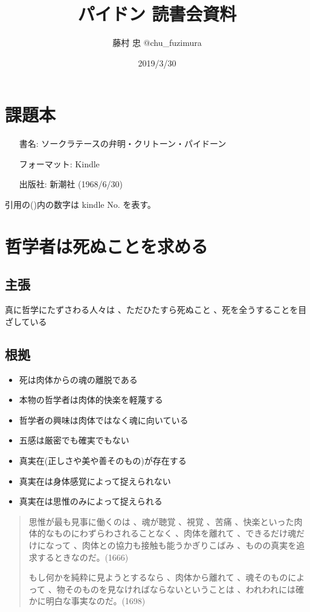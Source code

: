 \documentclass[a4j,11pt]{jarticle}
\author{藤村 忠 @chu\_fuzimura}
\title{パイドン 読書会資料}
\date{2019/3/30}
\begin{document}
\maketitle

\section*{課題本}
\begin{itemize}
    \item[書名:] ソークラテースの弁明・クリトーン・パイドーン
    \item[フォーマット:] Kindle
    \item[出版社:] 新潮社 (1968/6/30)  
\end{itemize}

引用の()内の数字は kindle No. を表す。

\section{哲学者は死ぬことを求める}

\subsection{主張}
真に哲学にたずさわる人々は 、ただひたすら死ぬこと 、死を全うすることを目ざしている

\subsection{根拠}

\begin{itemize}
    \item 死は肉体からの魂の離脱である
    \item 本物の哲学者は肉体的快楽を軽蔑する
    \item 哲学者の興味は肉体ではなく魂に向いている
    \item 五感は厳密でも確実でもない
    \item 真実在(正しさや美や善そのもの)が存在する
    \item 真実在は身体感覚によって捉えられない
    \item 真実在は思惟のみによって捉えられる
\end{itemize}

\begin{quotation}
    思惟が最も見事に働くのは 、魂が聴覚 、視覚 、苦痛 、快楽といった肉体的なものにわずらわされることなく 、肉体を離れて 、できるだけ魂だけになって 、肉体との協力も接触も能うかぎりこばみ 、ものの真実を追求するときなのだ。(1666)
    
    もし何かを純粋に見ようとするなら 、肉体から離れて 、魂そのものによって 、物そのものを見なければならないということは 、われわれには確かに明白な事実なのだ。(1698)
\end{quotation}
\end{document}
